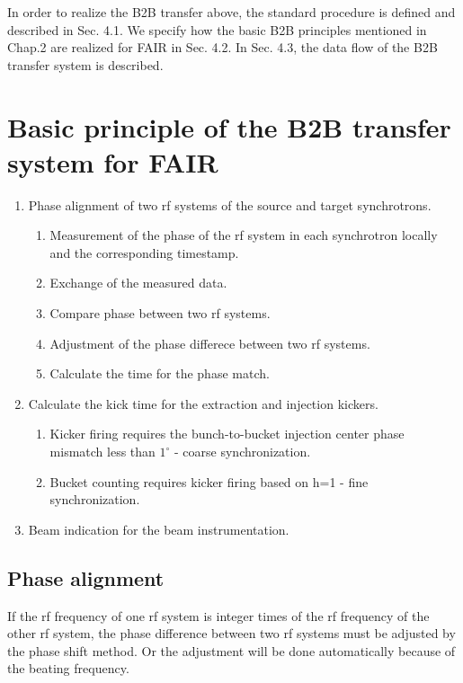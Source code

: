 

In order to realize the B2B transfer above, the standard procedure is defined and described in Sec. 4.1. We specify how the basic B2B principles mentioned in Chap.2 are realized for FAIR in Sec. 4.2. In Sec. 4.3, the data flow of the B2B transfer system is described. 

\section{Basic principle of the B2B transfer system for FAIR} 

\begin{enumerate}
\item Phase alignment of two rf systems of the source and target synchrotrons.
\begin{enumerate}
\item Measurement of the phase of the rf system in each synchrotron locally and the corresponding timestamp.
\item Exchange of the measured data.
\item Compare phase between two rf systems.
\item Adjustment of the phase differece between two rf systems. 
\item Calculate the time for the phase match.
\end{enumerate}
\item Calculate the kick time for the extraction and injection kickers.
\begin{enumerate}
\item Kicker firing requires the bunch-to-bucket injection center phase mismatch less than $1^\circ$ - coarse synchronization.
\item Bucket counting requires kicker firing based on h=1 - fine synchronization.
\end{enumerate}
\item Beam indication for the beam instrumentation.
\end{enumerate}

\subsection{Phase alignment}
If the rf frequency of one rf system is integer times of the rf frequency of the other rf system, the phase difference between two rf systems must be adjusted by the phase shift method. Or the adjustment will be done automatically because of the beating frequency.
